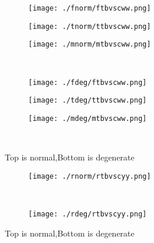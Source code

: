 \documentclass[aps,floats,floatfix,nofootinbib]{revtex4-1}
\begin{document}
\begin{center}
\begin{figure}
\begin{subfigure}{0.3\textwidth}
\texttt{[image: ./fnorm/ftbvscww.png]}
\label{}
\end{subfigure}
\begin{subfigure}{0.3\textwidth}
\texttt{[image: ./tnorm/ttbvscww.png]}
\label{}
\end{subfigure}
\begin{subfigure}{0.3\textwidth}
\texttt{[image: ./mnorm/mtbvscww.png]}
\label{}
\end{subfigure}\\
\begin{subfigure}{0.3\textwidth}
\texttt{[image: ./fdeg/ftbvscww.png]}
\label{}
\end{subfigure}
\begin{subfigure}{0.3\textwidth}
\texttt{[image: ./tdeg/ttbvscww.png]}
\label{}
\end{subfigure}
\begin{subfigure}{0.3\textwidth}
\texttt{[image: ./mdeg/mtbvscww.png]}
\label{}
\end{subfigure}\\
\caption{Top is normal,Bottom is degenerate}
\end{figure}
\end{center}

\begin{center}
\begin{figure}
\begin{subfigure}{1.0\textwidth}
\texttt{[image: ./rnorm/rtbvscyy.png]}
\label{}
\end{subfigure}\\
\begin{subfigure}{1.0\textwidth}
\texttt{[image: ./rdeg/rtbvscyy.png]}
\label{}
\end{subfigure}
\caption{Top is normal,Bottom is degenerate}
\end{figure}
\end{center}
\end{document}
